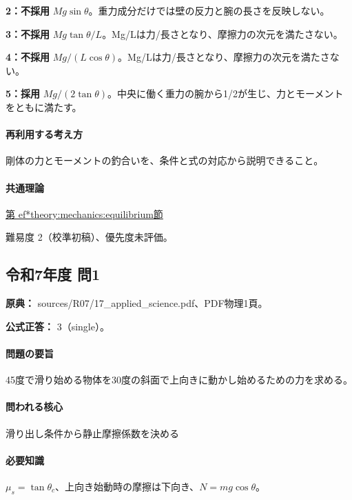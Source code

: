 \noindent\textbf{2：不採用} \(Mg\sin\theta\)。重力成分だけでは壁の反力と腕の長さを反映しない。\par

\noindent\textbf{3：不採用} \(Mg\tan\theta/L\)。Mg/Lは力/長さとなり、摩擦力の次元を満たさない。\par

\noindent\textbf{4：不採用} \(Mg/(L\cos\theta)\)。Mg/Lは力/長さとなり、摩擦力の次元を満たさない。\par

\noindent\textbf{5：採用} \(Mg/(2\tan\theta)\)。中央に働く重力の腕から1/2が生じ、力とモーメントをともに満たす。\par

\paragraph{再利用する考え方} 剛体の力とモーメントの釣合いを、条件と式の対応から説明できること。

\paragraph{共通理論} \hyperref[theory:mechanics:equilibrium]{第
ef*{theory:mechanics:equilibrium}節}

\par 難易度 2（校準初稿）、優先度未評価。

\subsection{令和7年度 問1}
\label{q:r07-reg-applied-01}

\noindent\textbf{原典：} sources/R07/17\_applied\_science.pdf、PDF物理1頁。

\textbf{公式正答：} 3（single）。

\paragraph{問題の要旨} 45度で滑り始める物体を30度の斜面で上向きに動かし始めるための力を求める。

\paragraph{問われる核心} 滑り出し条件から静止摩擦係数を決める

\paragraph{必要知識} \(\mu_s=\tan\theta_c\)、上向き始動時の摩擦は下向き、\(N=mg\cos\theta\)。

